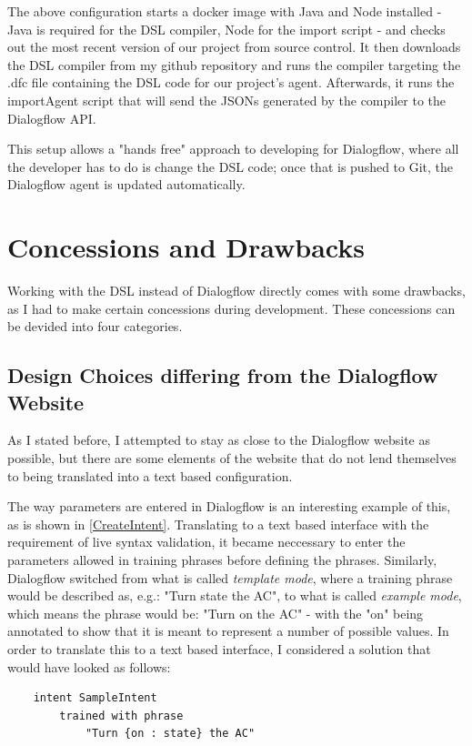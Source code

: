 The above configuration starts a docker image with Java and Node installed - Java is required for the DSL compiler, Node for the import script - and checks out the most recent version of our project from source control.
It then downloads the DSL compiler from my github repository and runs the compiler targeting the .dfc file containing the DSL code for our project's agent.
Afterwards, it runs the importAgent script that will send the JSONs generated by the compiler to the Dialogflow API.

This setup allows a "hands free" approach to developing for Dialogflow, where all the developer has to do is change the DSL code; once that is pushed to Git, the Dialogflow agent is updated automatically.


\section{Concessions and Drawbacks}

Working with the DSL instead of Dialogflow directly comes with some drawbacks, as I had to make certain concessions during development. 
These concessions can be devided into four categories.

\subsection{Design Choices differing from the Dialogflow Website}
As I stated before, I attempted to stay as close to the Dialogflow website as possible, but there are some elements of the website that do not lend themselves to being translated into a text based configuration.

The way parameters are entered in Dialogflow is an interesting example of this, as is shown in \autoref{CreateIntent}. Translating to a text based interface with the requirement of live syntax validation, it became neccessary to enter the parameters allowed in training phrases before defining the phrases.
Similarly, Dialogflow switched from what is called \textit{template mode}, where a training phrase would be described as, e.g.: "Turn state the AC", to what is called \textit{example mode}, which means the phrase would be: "Turn on the AC" - with the "on" being annotated to show that it is meant to represent a number of possible values.
In order to translate this to a text based interface, I considered a solution that would have looked as follows:

\begin{verbatim}
    intent SampleIntent
        trained with phrase
            "Turn {on : state} the AC"
\end{verbatim}

